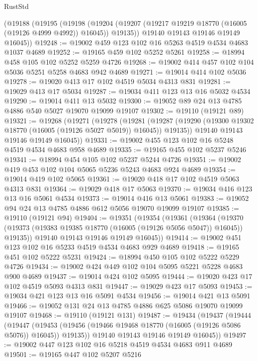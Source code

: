 \begin{lexlean}{RustStd}
\begin{coremodule}
    (@19188
      (@19195
        (@19198
          (@19204 (@19207 (@19217 @19219 @18770 (@16005 (@19126 @4999 @4992)) @16045)) @19135))
        @19140
        @19143
        @19146
        @19149
        @16045))
@19248 := @19002 @459 @123 @102 @16 @5263 @4519 @4534 @4683 @1037 @4689
@19252 := @19165 @459 @102 @5252 @5261
@19258 := @18994 @458 @105 @102 @5252 @5259 @4726
@19268 := @19002 @414 @457 @102 @104 @5036 @5251 @5258 @4683 @942 @4689
@19271 := @19014 @414 @102 @5036
@19278 := @19020 @413 @17 @102 @4519 @5034 @4313 @831
@19281 := @19029 @413 @17 @5034
@19287 := @19034 @411 @123 @13 @16 @5032 @4534
@19290 := @19014 @411 @13 @5032
@19300 := @19052 @89 @24 @13 @4785 @4886 @540 @5027 @19070 @19099 @19107
@19302 := @19110 (@19121 @89)
@19321 := @19268
    (@19271
      (@19278
        (@19281
          (@19287 (@19290 (@19300 @19302 @18770 (@16005 (@19126 @5027 @5019)) @16045)) @19135))
        @19140
        @19143
        @19146
        @19149
        @16045))
@19331 := @19002 @455 @123 @102 @16 @5248 @4519 @4534 @4683 @958 @4689
@19335 := @19165 @455 @102 @5237 @5246
@19341 := @18994 @454 @105 @102 @5237 @5244 @4726
@19351 := @19002 @419 @453 @102 @104 @5065 @5236 @5243 @4683 @924 @4689
@19354 := @19014 @419 @102 @5065
@19361 := @19020 @418 @17 @102 @4519 @5063 @4313 @831
@19364 := @19029 @418 @17 @5063
@19370 := @19034 @416 @123 @13 @16 @5061 @4534
@19373 := @19014 @416 @13 @5061
@19383 := @19052 @94 @24 @13 @4785 @4886 @612 @5056 @19070 @19099 @19107
@19385 := @19110 (@19121 @94)
@19404 := @19351
    (@19354
      (@19361
        (@19364
          (@19370 (@19373 (@19383 @19385 @18770 (@16005 (@19126 @5056 @5047)) @16045)) @19135))
        @19140
        @19143
        @19146
        @19149
        @16045))
@19414 := @19002 @451 @123 @102 @16 @5233 @4519 @4534 @4683 @929 @4689
@19418 := @19165 @451 @102 @5222 @5231
@19424 := @18994 @450 @105 @102 @5222 @5229 @4726
@19434 := @19002 @424 @449 @102 @104 @5095 @5221 @5228 @4683 @900 @4689
@19437 := @19014 @424 @102 @5095
@19444 := @19020 @423 @17 @102 @4519 @5093 @4313 @831
@19447 := @19029 @423 @17 @5093
@19453 := @19034 @421 @123 @13 @16 @5091 @4534
@19456 := @19014 @421 @13 @5091
@19466 := @19052 @131 @24 @13 @4785 @4886 @625 @5086 @19070 @19099 @19107
@19468 := @19110 (@19121 @131)
@19487 := @19434
    (@19437
      (@19444
        (@19447
          (@19453 (@19456 (@19466 @19468 @18770 (@16005 (@19126 @5086 @5076)) @16045)) @19135))
        @19140
        @19143
        @19146
        @19149
        @16045))
@19497 := @19002 @447 @123 @102 @16 @5218 @4519 @4534 @4683 @911 @4689
@19501 := @19165 @447 @102 @5207 @5216

\end{coremodule}
\end{lexlean}
